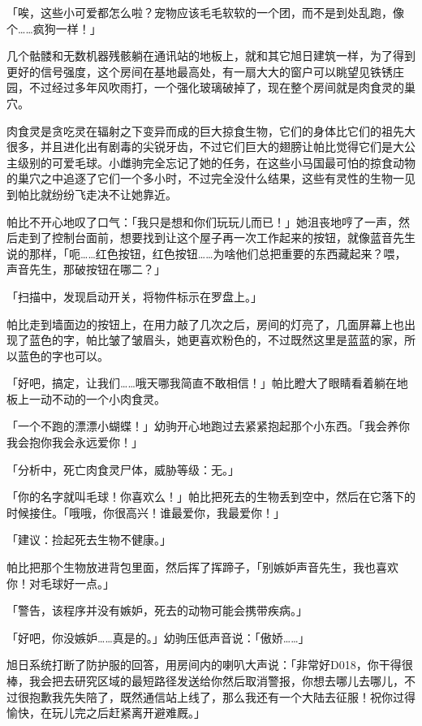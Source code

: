 「唉，这些小可爱都怎么啦？宠物应该毛毛软软的一个团，而不是到处乱跑，像个……疯狗一样！」

几个骷髅和无数机器残骸躺在通讯站的地板上，就和其它旭日建筑一样，为了得到更好的信号强度，这个房间在基地最高处，有一扇大大的窗户可以眺望见铁锈庄园，不过经过多年风吹雨打，一个强化玻璃破掉了，现在整个房间就是肉食灵的巢穴。

肉食灵是贪吃灵在辐射之下变异而成的巨大掠食生物，它们的身体比它们的祖先大很多，并且进化出有剧毒的尖锐牙齿，不过它们巨大的翅膀让帕比觉得它们是大公主级别的可爱毛球。小雌驹完全忘记了她的任务，在这些小马国最可怕的掠食动物的巢穴之中追逐了它们一个多小时，不过完全没什么结果，这些有灵性的生物一见到帕比就纷纷飞走决不让她靠近。

帕比不开心地叹了口气：「我只是想和你们玩玩儿而已！」她沮丧地哼了一声，然后走到了控制台面前，想要找到让这个屋子再一次工作起来的按钮，就像蓝音先生说的那样，「呃……红色按钮，红色按钮……为啥他们总把重要的东西藏起来？喂，声音先生，那破按钮在哪二？」

「{\mt 扫描中，发现启动开关，将物件标示在罗盘上。}」

帕比走到墙面边的按钮上，在用力敲了几次之后，房间的灯亮了，几面屏幕上也出现了蓝色的字，帕比皱了皱眉头，她更喜欢粉色的，不过既然这里是蓝蓝的家，所以蓝色的字也可以。

「好吧，搞定，让我们……哦天哪我简直不敢相信！」帕比瞪大了眼睛看着躺在地板上一动不动的一个小肉食灵。

「一个不跑的漂漂小蝴蝶！」幼驹开心地跑过去紧紧抱起那个小东西。「我会养你我会抱你我会永远爱你！」

「{\mt 分析中，死亡肉食灵尸体，威胁等级：无。}」

「你的名字就叫毛球！你喜欢么！」帕比把死去的生物丢到空中，然后在它落下的时候接住。「哦哦，你很高兴！谁最爱你，我最爱你！」

「{\mt 建议：捡起死去生物不健康。}」

帕比把那个生物放进背包里面，然后挥了挥蹄子，「别嫉妒声音先生，我也喜欢你！对毛球好一点。」

「{\mt 警告，该程序并没有嫉妒，死去的动物可能会携带疾病。}」

「好吧，你没嫉妒……真是的。」幼驹压低声音说：「傲娇……」

旭日系统打断了防护服的回答，用房间内的喇叭大声说：「非常好D018，你干得很棒，我会把去研究区域的最短路径发送给你然后取消警报，你想去哪儿去哪儿，不过很抱歉我先失陪了，既然通信站上线了，那么我还有一个大陆去征服！祝你过得愉快，在玩儿完之后赶紧离开避难厩。」

\horizonline


